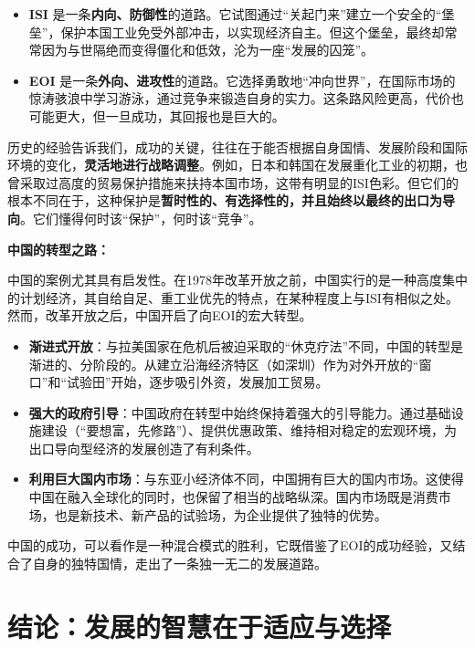 \begin{itemize}
    \item \textbf{ISI} 是一条\textbf{内向、防御性}的道路。它试图通过“关起门来”建立一个安全的“堡垒”，保护本国工业免受外部冲击，以实现经济自主。但这个堡垒，最终却常常因为与世隔绝而变得僵化和低效，沦为一座“发展的囚笼”。
    \item \textbf{EOI} 是一条\textbf{外向、进攻性}的道路。它选择勇敢地“冲向世界”，在国际市场的惊涛骇浪中学习游泳，通过竞争来锻造自身的实力。这条路风险更高，代价也可能更大，但一旦成功，其回报也是巨大的。
\end{itemize}

历史的经验告诉我们，成功的关键，往往在于能否根据自身国情、发展阶段和国际环境的变化，\textbf{灵活地进行战略调整}。例如，日本和韩国在发展重化工业的初期，也曾采取过高度的贸易保护措施来扶持本国市场，这带有明显的ISI色彩。但它们的根本不同在于，这种保护是\textbf{暂时性的、有选择性的，并且始终以最终的出口为导向}。它们懂得何时该“保护”，何时该“竞争”。

\textbf{中国的转型之路：}

中国的案例尤其具有启发性。在1978年改革开放之前，中国实行的是一种高度集中的计划经济，其自给自足、重工业优先的特点，在某种程度上与ISI有相似之处。然而，改革开放之后，中国开启了向EOI的宏大转型。

\begin{itemize}
    \item \textbf{渐进式开放}：与拉美国家在危机后被迫采取的“休克疗法”不同，中国的转型是渐进的、分阶段的。从建立沿海经济特区（如深圳）作为对外开放的“窗口”和“试验田”开始，逐步吸引外资，发展加工贸易。
    \item \textbf{强大的政府引导}：中国政府在转型中始终保持着强大的引导能力。通过基础设施建设（“要想富，先修路”）、提供优惠政策、维持相对稳定的宏观环境，为出口导向型经济的发展创造了有利条件。
    \item \textbf{利用巨大国内市场}：与东亚小经济体不同，中国拥有巨大的国内市场。这使得中国在融入全球化的同时，也保留了相当的战略纵深。国内市场既是消费市场，也是新技术、新产品的试验场，为企业提供了独特的优势。
\end{itemize}

中国的成功，可以看作是一种混合模式的胜利，它既借鉴了EOI的成功经验，又结合了自身的独特国情，走出了一条独一无二的发展道路。

\section{结论：发展的智慧在于适应与选择}

